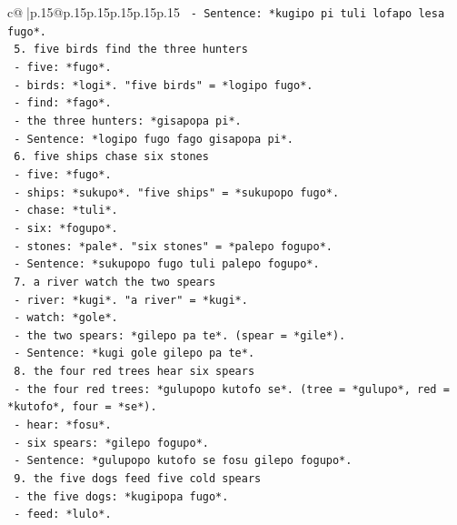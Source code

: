 \documentclass{article}
\begin{document}
{\begin{supertabular}{c@{$\;$}|p{.15\linewidth}@{}p{.15\linewidth}p{.15\linewidth}p{.15\linewidth}p{.15\linewidth}p{.15\linewidth}}
{{{\texttt{         {-} Sentence: *kugipo pi tuli lofapo lesa fugo*.} \\
\texttt{      5. five birds find the three hunters} \\
\texttt{         {-} five: *fugo*.} \\
\texttt{         {-} birds: *logi*. "five birds" = *logipo fugo*.} \\
\texttt{         {-} find: *fago*.} \\
\texttt{         {-} the three hunters: *gisapopa pi*.} \\
\texttt{         {-} Sentence: *logipo fugo fago gisapopa pi*.} \\
\texttt{      6. five ships chase six stones} \\
\texttt{         {-} five: *fugo*.} \\
\texttt{         {-} ships: *sukupo*. "five ships" = *sukupopo fugo*.} \\
\texttt{         {-} chase: *tuli*.} \\
\texttt{         {-} six: *fogupo*.} \\
\texttt{         {-} stones: *pale*. "six stones" = *palepo fogupo*.} \\
\texttt{         {-} Sentence: *sukupopo fugo tuli palepo fogupo*.} \\
\texttt{      7. a river watch the two spears} \\
\texttt{         {-} river: *kugi*. "a river" = *kugi*.} \\
\texttt{         {-} watch: *gole*.} \\
\texttt{         {-} the two spears: *gilepo pa te*. (spear = *gile*).} \\
\texttt{         {-} Sentence: *kugi gole gilepo pa te*.} \\
\texttt{      8. the four red trees hear six spears} \\
\texttt{         {-} the four red trees: *gulupopo kutofo se*. (tree = *gulupo*, red = *kutofo*, four = *se*).} \\
\texttt{         {-} hear: *fosu*.} \\
\texttt{         {-} six spears: *gilepo fogupo*.} \\
\texttt{         {-} Sentence: *gulupopo kutofo se fosu gilepo fogupo*.} \\
\texttt{      9. the five dogs feed five cold spears} \\
\texttt{         {-} the five dogs: *kugipopa fugo*.} \\
\texttt{         {-} feed: *lulo*.} \\
}}}
\end{supertabular}}
\end{document}
